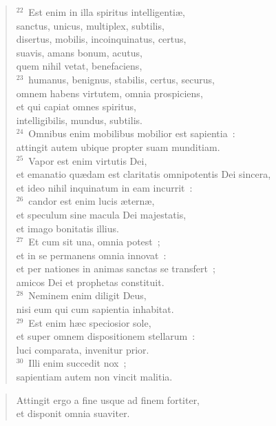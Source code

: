 \begin{flushleft}\begin{verse}${}^{22}$~Est enim in illa spiritus intelligenti\ae ,\\ sanctus, unicus, multiplex, subtilis,\\ disertus, mobilis, incoinquinatus, certus,\\ suavis, amans bonum, acutus,\\ quem nihil vetat, benefaciens,\\
${}^{23}$~humanus, benignus, stabilis, certus, securus,\\ omnem habens virtutem, omnia prospiciens,\\ et qui capiat omnes spiritus,\\ intelligibilis, mundus, subtilis.\\
${}^{24}$~Omnibus enim mobilibus mobilior est sapientia~:\\ attingit autem ubique propter suam munditiam.\\
${}^{25}$~Vapor est enim virtutis Dei,\\ et emanatio qu\ae dam est claritatis omnipotentis Dei sincera,\\ et ideo nihil inquinatum in eam incurrit~:\\
${}^{26}$~candor est enim lucis \ae tern\ae ,\\ et speculum sine macula Dei majestatis,\\ et imago bonitatis illius.\\
${}^{27}$~Et cum sit una, omnia potest~;\\ et in se permanens omnia innovat~:\\ et per nationes in animas sanctas se transfert~;\\ amicos Dei et prophetas constituit.\\
${}^{28}$~Neminem enim diligit Deus,\\ nisi eum qui cum sapientia inhabitat.\\
${}^{29}$~Est enim h\ae c speciosior sole,\\ et super omnem dispositionem stellarum~:\\ luci comparata, invenitur prior.\\
${}^{30}$~Illi enim succedit nox~;\\ sapientiam autem non vincit malitia.\end{verse}\end{flushleft}


\begin{flushleft}\begin{verse}\vspace{-19pt}Attingit ergo a fine usque ad finem fortiter,\\ et disponit omnia suaviter.\end{verse}\end{flushleft}


